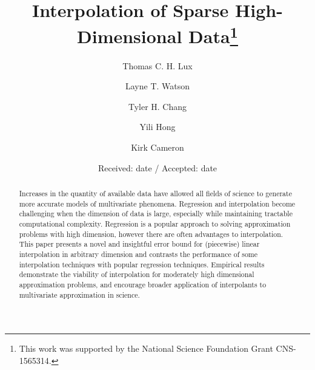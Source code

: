 \documentclass[smallextended,final]{svjour3}  %
\begin{document}


\title{Interpolation of Sparse High-Dimensional Data\thanks
  {This work was supported by the National Science Foundation Grant CNS-1565314.}
}

\author{Thomas C. H. Lux   \and
  Layne T. Watson          \and
  Tyler H. Chang           \and
  Yili Hong                \and
  Kirk Cameron
}



\date{Received: date / Accepted: date}

{\let\newpage\relax\maketitle}


\setcounter{page}{1}

\begin{abstract}
Increases in the quantity of available data have allowed all fields of
science to generate more accurate models of multivariate phenomena.
Regression and interpolation become challenging when the dimension of
data is large, especially while maintaining tractable computational
complexity. Regression is a popular approach to solving approximation
problems with high dimension, however there are often advantages to
interpolation. This paper presents a novel and insightful error bound
for (piecewise) linear interpolation in arbitrary dimension and
contrasts the performance of some interpolation techniques with
popular regression techniques. Empirical results demonstrate the
viability of interpolation for moderately high dimensional
approximation problems, and encourage broader application of
interpolants to multivariate approximation in science.

\end{abstract}
\end{document}
